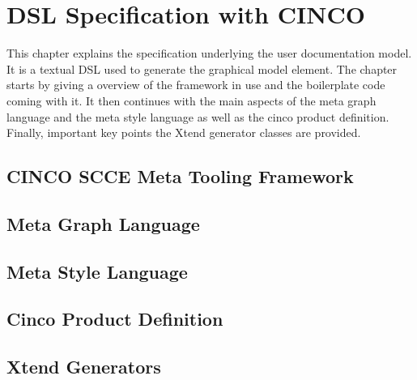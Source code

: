 
\chapter{DSL Specification with CINCO}\label{ch:DSL}
This chapter explains the specification underlying the user documentation model. It is a textual DSL used to generate the graphical model element. The chapter starts by giving a overview of the framework in use and the boilerplate code coming with it. It then continues with the main aspects of the meta graph language and the meta style language as well as the cinco product definition. Finally, important key points the Xtend generator classes are provided.
\section{CINCO SCCE Meta Tooling Framework}\label{sec:CTF}
\section{Meta Graph Language}\label{sec:MGL}
\section{Meta Style Language}\label{sec:MSL}
\section{Cinco Product Definition}\label{sec:CPD}
\section{Xtend Generators}\label{sec:GEN}
